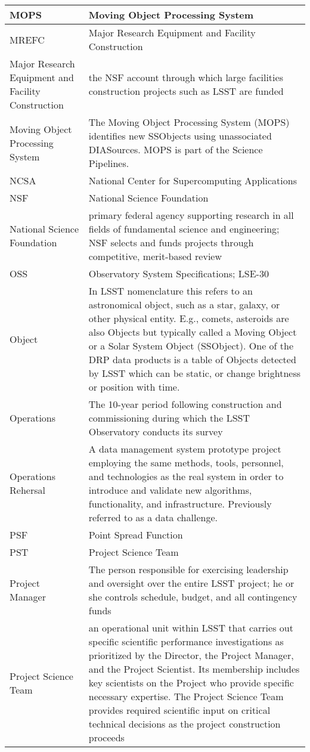 \begin{longtable}{|l|p{}|}
MOPS & Moving \gls{Object} Processing System \\\hline
MREFC & \gls{Major Research Equipment and Facility Construction} \\\hline
Major Research Equipment and Facility \gls{Construction} & the \gls{NSF} account through which large facilities construction projects such as \gls{LSST} are funded \\\hline
Moving \gls{Object} Processing System & The Moving \gls{Object} Processing System (\gls{MOPS}) identifies new SSObjects using unassociated DIASources. \gls{MOPS} is part of the \gls{Science Pipelines}. \\\hline
NCSA & National \gls{Center} for Supercomputing Applications \\\hline
NSF & \gls{National Science Foundation} \\\hline
National Science Foundation & primary federal agency supporting research in all fields of fundamental science and engineering; \gls{NSF} selects and funds projects through competitive, merit-based review \\\hline
OSS & Observatory System Specifications; LSE-30 \\\hline
Object & In \gls{LSST} nomenclature this refers to an \gls{astronomical object}, such as a star, galaxy, or other physical entity. E.g., comets, asteroids are also Objects but typically called a Moving \gls{Object} or a Solar System \gls{Object} (SSObject). One of the \gls{DRP} data products is a table of Objects detected by \gls{LSST} which can be static, or change brightness or position with time. \\\hline
Operations & The 10-year period following construction and commissioning during which the \gls{LSST} Observatory conducts its survey \\\hline
Operations Rehersal & A data management system prototype project employing the same methods, tools, personnel, and technologies as the real system in order to introduce and validate new algorithms, functionality, and infrastructure. Previously referred to as a data challenge. \\\hline
PSF & Point Spread Function \\\hline
PST & \gls{Project Science Team} \\\hline
Project Manager & The person responsible for exercising leadership and oversight over the entire \gls{LSST} project; he or she controls schedule, budget, and all contingency funds \\\hline
Project Science Team & an operational unit within \gls{LSST} that carries out specific scientific performance investigations as prioritized by the \gls{Director}, the \gls{Project Manager}, and the \gls{Project Scientist}. Its membership includes key scientists on the Project who provide specific necessary expertise. The \gls{Project Science Team} provides required scientific input on critical technical decisions as the project construction proceeds \\\hline

\end{longtable}
